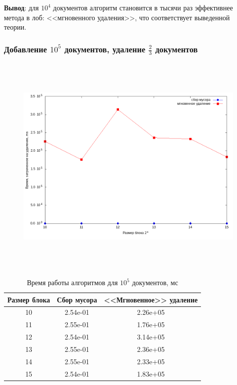 \textbf{Вывод}: для $10^4$ документов алгоритм становится в тысячи раз
эффективнее метода в лоб: <<мгновенного удаления>>, что соответствует выведенной теории.

\subsubsection{Добавление $10^5$ документов, удаление $\frac{2}{3}$ документов}

\begin{figure}[H]
\includegraphics[width=\linewidth, height=11cm]{fig/time_1e5.png}
\end{figure}

\begin{table}[H]
      \caption{Время работы алгоритмов для $10^5$ документов, мс}
      \centering
      \small
      \singlespacing
      \begin{tabular}{|c|c|c|}
            \hline
            Размер блока & Сбор мусора                & <<Мгновенное>> удаление \\ \hline \hline
            10           & 2.54e-01                   & 2.26e+05              \\ \hline
            11           & 2.55e-01                   & 1.76e+05              \\ \hline
            12           & 2.54e-01                   & 3.14e+05              \\ \hline
            13           & 2.55e-01                   & 2.36e+05              \\ \hline
            14           & 2.55e-01                   & 2.33e+05              \\ \hline
            15           & 2.54e-01                   & 1.83e+05              \\ \hline
\end{tabular}
\end{table}

